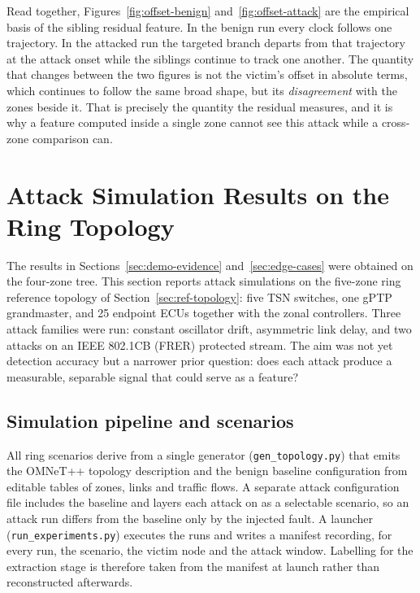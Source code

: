 Read together, Figures~\ref{fig:offset-benign} and~\ref{fig:offset-attack} are the
empirical basis of the sibling residual feature. In the benign run every clock
follows one trajectory. In the attacked run the targeted branch departs from that
trajectory at the attack onset while the siblings continue to track one another.
The quantity that changes between the two figures is not the victim's offset in
absolute terms, which continues to follow the same broad shape, but its
\emph{disagreement} with the zones beside it. That is precisely the quantity the
residual measures, and it is why a feature computed inside a single zone cannot see
this attack while a cross-zone comparison can.

\section{Attack Simulation Results on the Ring Topology}
\label{sec:ring-results}

The results in Sections~\ref{sec:demo-evidence} and~\ref{sec:edge-cases} were obtained on
the four-zone tree. This section reports attack simulations on the five-zone ring
reference topology of Section~\ref{sec:ref-topology}: five TSN switches, one gPTP
grandmaster, and 25 endpoint ECUs together with the zonal controllers. Three attack
families were run: constant oscillator drift, asymmetric link delay, and two attacks on
an IEEE 802.1CB (FRER) protected stream. The aim was not yet detection accuracy but a
narrower prior question: does each attack produce a measurable, separable signal that
could serve as a feature?

\subsection{Simulation pipeline and scenarios}

All ring scenarios derive from a single generator (\texttt{gen\_topology.py}) that
emits the OMNeT++ topology description and the benign baseline configuration from
editable tables of zones, links and traffic flows. A separate attack configuration
file includes the baseline and layers each attack on as a selectable scenario, so an
attack run differs from the baseline only by the injected fault. A launcher
(\texttt{run\_experiments.py}) executes the runs and writes a manifest recording, for
every run, the scenario, the victim node and the attack window. Labelling for the
extraction stage is therefore taken from the manifest at launch rather than
reconstructed afterwards.

